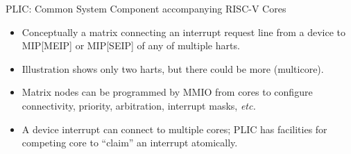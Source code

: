 \documentclass{article}
\newcommand{\etc}{\emph{etc.}}
\begin{document}
\clearpage


\begin{center}
  {\Huge
    PLIC: Common System Component accompanying RISC-V Cores}

  \vspace*{0.5in}


  \vspace*{0.5in}

  \begin{minipage}[t]{9in}
    \begin{itemize}\LARGE

    \item Conceptually a matrix connecting an interrupt request line
      from a device to MIP[MEIP] or MIP[SEIP] of any of multiple harts.

    \item Illustration shows only two harts, but there could be more (multicore).

    \item Matrix nodes can be programmed by MMIO from cores to
      configure connectivity, priority, arbitration, interrupt masks, {\etc}

    \item A device interrupt can connect to multiple cores; PLIC has
      facilities for competing core to ``claim'' an interrupt
      atomically.
    \end{itemize}
  \end{minipage}
\end{center}

\clearpage

\end{document}
